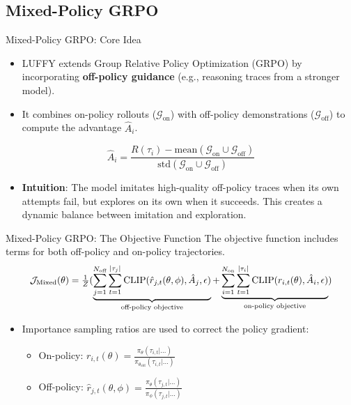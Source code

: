 \documentclass{beamer}
\begin{document}
\subsection{Mixed-Policy GRPO}
\begin{frame}{Mixed-Policy GRPO: Core Idea}
    \begin{itemize}
        \item LUFFY extends Group Relative Policy Optimization (GRPO) by incorporating \textbf{off-policy guidance} (e.g., reasoning traces from a stronger model).
        \item It combines on-policy rollouts ($\mathcal{G}_{\text{on}}$) with off-policy demonstrations ($\mathcal{G}_{\text{off}}$) to compute the advantage $\hat{A}_i$.
        \end{itemize}
        \begin{equation*}
            \hat{A}_i = \frac{R(\tau_i) - \text{mean}(\mathcal{G}_{\text{on}} \cup \mathcal{G}_{\text{off}})}{\text{std}(\mathcal{G}_{\text{on}} \cup \mathcal{G}_{\text{off}})}
        \end{equation*}
    \begin{itemize}
        \item \textbf{Intuition}: The model imitates high-quality off-policy traces when its own attempts fail, but explores on its own when it succeeds. This creates a dynamic balance between imitation and exploration.
    \end{itemize}
\end{frame}

\begin{frame}{Mixed-Policy GRPO: The Objective Function}
    The objective function includes terms for both off-policy and on-policy trajectories.
    \begin{equation*}
    \resizebox{0.9\hsize}{!}{$
        \mathcal{J}_{\text{Mixed}}(\theta) = \frac{1}{Z} (\underbrace{\sum_{j=1}^{N_{\text{off}}} \sum_{t=1}^{|\tau_j|} 
        \text{CLIP}(\hat{r}_{j,t}(\theta, \phi),\hat{A}_j, \epsilon)}_{\text{off-policy objective}}
        + \underbrace{\sum_{i=1}^{N_{\text{on}}} \sum_{t=1}^{|\tau_i|} \text{CLIP}(r_{i,t}(\theta),\hat{A}_i, \epsilon)}_\text{on-policy objective})
    $}
    \end{equation*}
    \begin{itemize}
        \item Importance sampling ratios are used to correct the policy gradient:
        \begin{itemize}
            \item On-policy: $r_{i,t}(\theta) = \frac{\pi_\theta(\tau_{i,t} | \dots)}{\pi_{\theta_{\text{old}}}(\tau_{i,t} | \dots)}$
            \item Off-policy: $\hat{r}_{j,t}(\theta, \phi) = \frac{\pi_{\theta}(\tau_{j,t} | \dots)}{\pi_{\phi}(\tau_{j,t} | \dots)}$
        \end{itemize}
    \end{itemize}
\end{frame}
\end{document}
